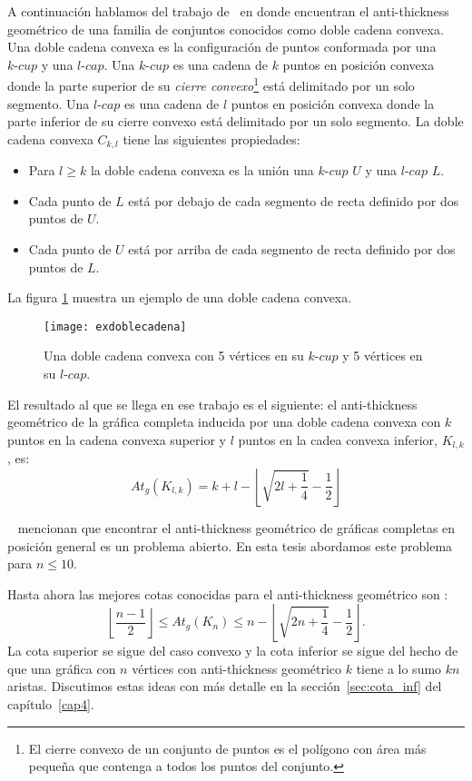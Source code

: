 A continuación hablamos del trabajo de~\cite{Lomeli2018} en donde encuentran el
anti-thickness geométrico de una familia de conjuntos conocidos como doble
cadena convexa. Una doble cadena convexa
es la configuración de puntos conformada por una $k\text{-}cup$ y una
$l\text{-}cap$. Una $k\text{-}cup$ es una cadena de $k$ puntos en posición
convexa donde la parte superior de su \emph{cierre convexo}\footnote{El cierre
convexo de un conjunto de puntos es el polígono con área más pequeña que
contenga a todos los puntos del conjunto.} está delimitado por un solo
segmento. Una $l\text{-}cap$ es una cadena de $l$ puntos en posición convexa
donde la parte inferior de su cierre convexo está delimitado por un solo
segmento. La doble cadena convexa $C_{k,l}$ tiene las siguientes propiedades:
\begin{itemize}
  \item Para $l\geq k$ la doble cadena convexa es la unión una $k\text{-}cup$ $U$ y una $l\text{-}cap$ $L$.
  \item Cada punto de $L$ está por debajo de cada segmento de recta definido por dos puntos de $U$.
  \item Cada punto de $U$ está por arriba de cada segmento de recta definido por dos puntos de $L$.
\end{itemize}

La figura \ref{fig:exdoblecadena} muestra un ejemplo de una doble cadena
convexa.
\begin{figure}[htpb]
  \centering
  \texttt{[image: exdoblecadena]}
  \caption{Una doble cadena convexa con 5 vértices en su $k\text{-}cup$ y 5 vértices en su $l\text{-}cap$.}
  \label{fig:exdoblecadena}
\end{figure}

El resultado al que se llega en ese trabajo es el siguiente: el anti-thickness
geométrico de la gráfica completa inducida por una doble cadena convexa con $k$
puntos en la cadena convexa superior y $l$ puntos en la cadea convexa inferior,
$K_{l,k}$, es:
 \[At_g(K_{l,k}) = k+l-\left\lfloor \sqrt{2l+\frac{1}{4}} - \frac{1}{2} \right\rfloor\]

 ~\cite{Dujmovic2017} mencionan que encontrar el anti-thickness geométrico de
 gráficas completas en posición general es un problema abierto. En esta tesis
 abordamos este problema para $n\leq 10$.

 Hasta ahora las mejores cotas conocidas para el anti-thickness geométrico son :
 \begin{equation}
   \left\lfloor\frac{n-1}{2}\right\rfloor \leq At_g(K_n) \leq n - \left\lfloor
 \sqrt{2n + \frac{1}{4}} - \frac{1}{2} \right\rfloor.
\end{equation}
 La cota superior se sigue del caso convexo y la cota inferior
 se sigue del hecho de que una gráfica con $n$ vértices
 con anti-thickness geométrico $k$ tiene a lo sumo $kn$ aristas. Discutimos
 estas ideas con más detalle en la sección~\ref{sec:cota_inf} del capítulo~\ref{cap4}.


